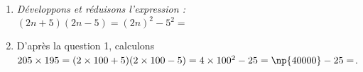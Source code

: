 
\medskip
 
\begin{enumerate}
\item \textit{Développons et réduisons l'expression :} $(2n + 5)(2n - 5)=(2n)^2-5^2=$ %
\item D'après la question 1, calculons $205 \times 195=(2\times 100+5)(2\times 100-5)=4\times 100^2-25= \np{40000} - 25= $. 
\end{enumerate}

\vspace{0,5cm}

